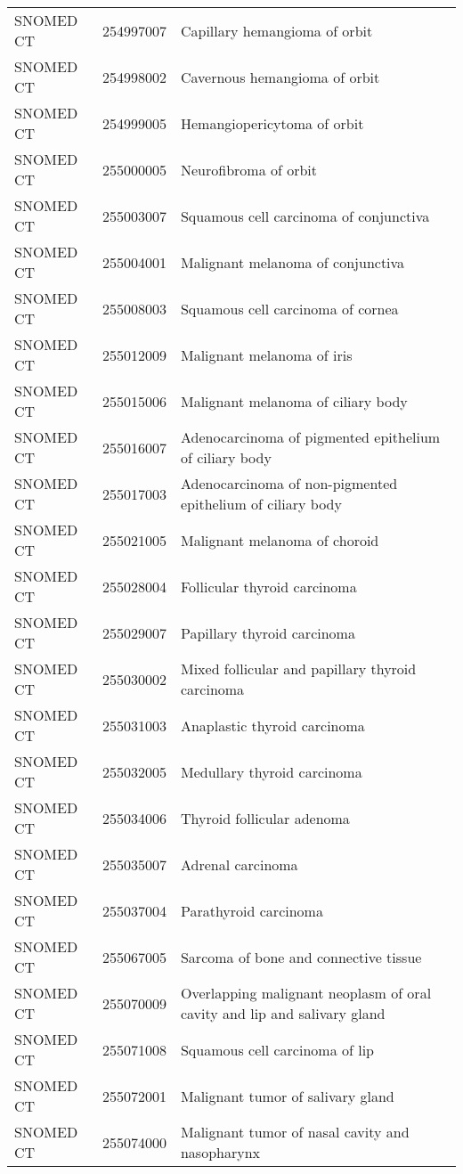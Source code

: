 \begin{longtable}{p{}p{}p{}}
  SNOMED CT & 254997007 & Capillary hemangioma of orbit \\ 
  SNOMED CT & 254998002 & Cavernous hemangioma of orbit \\ 
  SNOMED CT & 254999005 & Hemangiopericytoma of orbit \\ 
  SNOMED CT & 255000005 & Neurofibroma of orbit \\ 
  SNOMED CT & 255003007 & Squamous cell carcinoma of conjunctiva \\ 
  SNOMED CT & 255004001 & Malignant melanoma of conjunctiva \\ 
  SNOMED CT & 255008003 & Squamous cell carcinoma of cornea \\ 
  SNOMED CT & 255012009 & Malignant melanoma of iris \\ 
  SNOMED CT & 255015006 & Malignant melanoma of ciliary body \\ 
  SNOMED CT & 255016007 & Adenocarcinoma of pigmented epithelium of ciliary body \\ 
  SNOMED CT & 255017003 & Adenocarcinoma of non-pigmented epithelium of ciliary body \\ 
  SNOMED CT & 255021005 & Malignant melanoma of choroid \\ 
  SNOMED CT & 255028004 & Follicular thyroid carcinoma \\ 
  SNOMED CT & 255029007 & Papillary thyroid carcinoma \\ 
  SNOMED CT & 255030002 & Mixed follicular and papillary thyroid carcinoma \\ 
  SNOMED CT & 255031003 & Anaplastic thyroid carcinoma \\ 
  SNOMED CT & 255032005 & Medullary thyroid carcinoma \\ 
  SNOMED CT & 255034006 & Thyroid follicular adenoma \\ 
  SNOMED CT & 255035007 & Adrenal carcinoma \\ 
  SNOMED CT & 255037004 & Parathyroid carcinoma \\ 
  SNOMED CT & 255067005 & Sarcoma of bone and connective tissue \\ 
  SNOMED CT & 255070009 & Overlapping malignant neoplasm of oral cavity and lip and salivary gland \\ 
  SNOMED CT & 255071008 & Squamous cell carcinoma of lip \\ 
  SNOMED CT & 255072001 & Malignant tumor of salivary gland \\ 
  SNOMED CT & 255074000 & Malignant tumor of nasal cavity and nasopharynx \\ 

\end{longtable}
